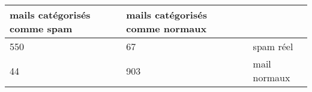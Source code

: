\begin{tabular}{l|l|l}
mails catégorisés comme spam  & mails catégorisés comme normaux & ~ \\
\hline
 550 & 67 &   spam réel \\
\hline
  44 & 903 &   mail normaux \\
\end{tabular}
